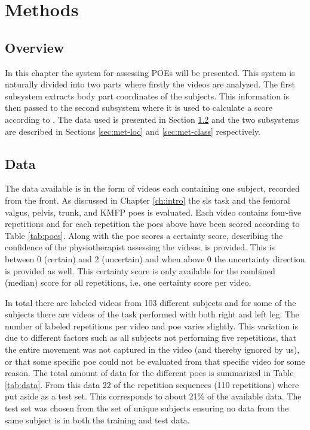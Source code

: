 \chapter{Methods} \label{ch:method}
\section{Overview}
In this chapter the system for assessing POEs will be presented. This system is naturally divided into two parts where firstly the videos are analyzed. The first subsystem extracts body part coordinates of the subjects. This information is then passed to the second subsystem where it is used to calculate a score according to \cite{Nae2017}. The data used is presented in Section \ref{sec:met-data} and the two subsystems are described in Sections \ref{sec:met-loc} and \ref{sec:met-class} respectively.

\section{Data}\label{sec:met-data}
The data available is in the form of videos each containing one subject, recorded from the front. As discussed in Chapter \ref{ch:intro} the \gls{sls} task and the femoral valgus, pelvis, trunk, and KMFP \glspl{poe} is evaluated. Each video contains four-five repetitions and for each repetition the \glspl{poe} above have been scored according to Table \ref{tab:poes}. Along with the \gls{poe} scores a certainty score, describing the confidence of the physiotherapist assessing the videos, is provided. This is between 0 (certain) and 2 (uncertain) and when above 0 the uncertainty direction is provided as well. This certainty score is only available for the combined (median) score for all repetitions, i.e. one certainty score per video.

In total there are labeled videos from 103 different subjects and for some of the subjects there are videos of the task performed with both right and left leg. The number of labeled repetitions per video and \gls{poe} varies slightly. This variation is due to different factors such as all subjects not performing five repetitions, that the entire movement was not captured in the video (and thereby ignored by us), or that some specific \gls{poe} could not be evaluated from that specific video for some reason. The total amount of data for the different \glspl{poe} is summarized in Table \ref{tab:data}. From this data 22 of the repetition sequences (110 repetitions) where put aside as a test set. This corresponds to about 21\% of the available data. The test set was chosen from the set of unique subjects ensuring no data from the same subject is in both the training and test data.

